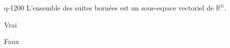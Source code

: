 \begin{truefalse}{q-1200}
L'ensemble des suites bornées est un sous-espace vectoriel de $\mathbb{R}^{\mathbb{N}}$.
\item* Vrai
\item Faux
\end{truefalse}

